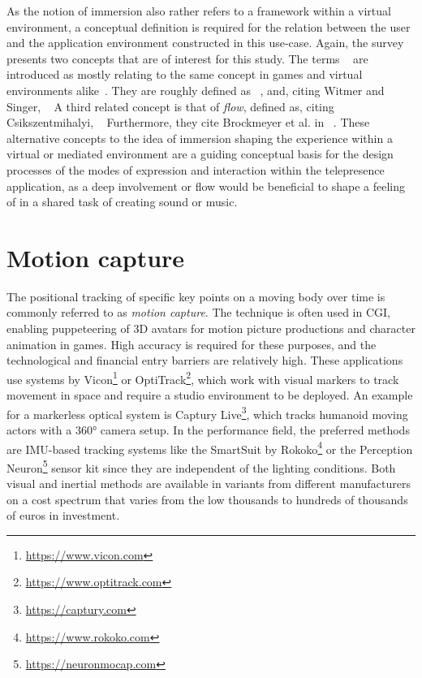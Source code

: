 As the notion of immersion also rather refers to a framework within a virtual environment, a conceptual definition is required for the relation between the user and the application environment constructed in this use-case.
Again, the survey presents two concepts that are of interest for this study.
The terms ~\parencite[8]{surveyOfPresence} are introduced as mostly relating to the same concept in games and virtual environments alike~\parencite[8]{surveyOfPresence}.
They are roughly defined as ~\parencite[8]{surveyOfPresence}, and, citing Witmer and Singer, ~\parencite[8]{surveyOfPresence}
A third related concept is that of \emph{flow}, defined as, citing Csikszentmihalyi, ~\parencite[9]{surveyOfPresence}
Furthermore, they cite Brockmeyer et al. in ~\parencite[9]{surveyOfPresence}.
These alternative concepts to the idea of immersion shaping the experience within a virtual or mediated environment are a guiding conceptual basis for the design processes of the modes of expression and interaction within the telepresence application, as a deep involvement or flow would be beneficial to shape a feeling of  in a shared task of creating sound or music.

\section{Motion capture}
\label{sec:motion-capture}

The positional tracking of specific key points on a moving body over time is commonly referred to as \emph{motion capture}.
The technique is often used in \ac{CGI}, enabling puppeteering of \ac{3D} avatars for motion picture productions and character animation in games.
High accuracy is required for these purposes, and the technological and financial entry barriers are relatively high.
These applications use systems by Vicon\footnote{\url{https://www.vicon.com}} or OptiTrack\footnote{\url{https://www.optitrack.com}}, which work with visual markers to track movement in space and require a studio environment to be deployed.
An example for a markerless optical system is Captury Live\footnote{\url{https://captury.com}}, which tracks humanoid moving actors with a 360° camera setup.
In the performance field, the preferred methods are \ac{IMU}-based tracking systems like the SmartSuit by Rokoko\footnote{\url{https://www.rokoko.com}} or the Perception Neuron\footnote{\url{https://neuronmocap.com}} sensor kit since they are independent of the lighting conditions.
Both visual and inertial methods are available in variants from different manufacturers on a cost spectrum that varies from the low thousands to hundreds of thousands of euros in investment.

